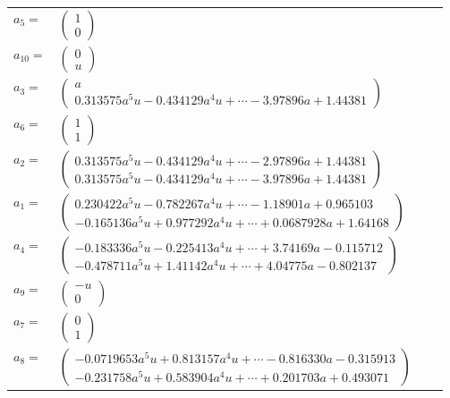 \documentclass[1p]{elsarticle_modified}
\theoremstyle{definition}
\begin{document}
\begin{tabular}{m{7pt} m{180pt} m{7pt} m{180pt} }
\flushright $a_{5}=$&$\begin{pmatrix}1\\0\end{pmatrix}$ \\
\flushright $a_{10}=$&$\begin{pmatrix}0\\u\end{pmatrix}$ \\
\flushright $a_{3}=$&$\begin{pmatrix}a\\0.313575 a^{5} u-0.434129 a^{4} u+\cdots-3.97896 a+1.44381\end{pmatrix}$ \\
\flushright $a_{6}=$&$\begin{pmatrix}1\\1\end{pmatrix}$ \\
\flushright $a_{2}=$&$\begin{pmatrix}0.313575 a^{5} u-0.434129 a^{4} u+\cdots-2.97896 a+1.44381\\0.313575 a^{5} u-0.434129 a^{4} u+\cdots-3.97896 a+1.44381\end{pmatrix}$ \\
\flushright $a_{1}=$&$\begin{pmatrix}0.230422 a^{5} u-0.782267 a^{4} u+\cdots-1.18901 a+0.965103\\-0.165136 a^{5} u+0.977292 a^{4} u+\cdots+0.0687928 a+1.64168\end{pmatrix}$ \\
\flushright $a_{4}=$&$\begin{pmatrix}-0.183336 a^{5} u-0.225413 a^{4} u+\cdots+3.74169 a-0.115712\\-0.478711 a^{5} u+1.41142 a^{4} u+\cdots+4.04775 a-0.802137\end{pmatrix}$ \\
\flushright $a_{9}=$&$\begin{pmatrix}- u\\0\end{pmatrix}$ \\
\flushright $a_{7}=$&$\begin{pmatrix}0\\1\end{pmatrix}$ \\
\flushright $a_{8}=$&$\begin{pmatrix}-0.0719653 a^{5} u+0.813157 a^{4} u+\cdots-0.816330 a-0.315913\\-0.231758 a^{5} u+0.583904 a^{4} u+\cdots+0.201703 a+0.493071\end{pmatrix}$ \\

\end{tabular}
\end{document}
